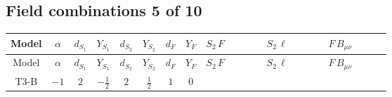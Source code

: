 \documentclass[8pt]{article}
\begin{document}
\begin{landscape}
\subsection*{Field combinations 5 of 10}
\begin{longtable}{@{}cccccccc >{\raggedright\arraybackslash}p{0.21\linewidth} >{\raggedright\arraybackslash}p{0.21\linewidth} >{\raggedright\arraybackslash}p{0.21\linewidth}@{}}
\toprule
Model & $\alpha$ & $d_{S_1}$ & $Y_{S_1}$ & $d_{S_2}$ & $Y_{S_2}$ & $d_F$ & $Y_F$ & $S_2\,F$ & $S_2\,\ell$ & $F\,B_{\mu\nu}$ \\
\midrule
\endfirsthead
\toprule
Model & $\alpha$ & $d_{S_1}$ & $Y_{S_1}$ & $d_{S_2}$ & $Y_{S_2}$ & $d_F$ & $Y_F$ & $S_2\,F$ & $S_2\,\ell$ & $F\,B_{\mu\nu}$ \\
\midrule
\endhead
T3-B & $-1$ & $2$ & $-\frac{1}{2}$ & $2$ & $\frac{1}{2}$ & $1$ & $0$ & \scriptsize\adjustbox{max width=\linewidth}{$\begin{gathered} -C_{S_2^\dagger S_2} \hbar  \log \left(\frac{\bar{\mu}^{2}}{M_F^2}\right) \overline{y_{2,i_1,r_1}} S_{2,j_1} y_{2,i_1,r_1} S_{2,j_1}{}^{\dagger } \\ -\hbar  \log \left(\frac{\bar{\mu}^{2}}{M_F^2}\right) \overline{y_{2,i_1,r_1}} \overline{y_{2,i_2,r_2}} S_{2,j_1} S_{2,j_2} y_{2,i_1,r_2} y_{2,i_2,r_1} S_{2,j_1}{}^{\dagger } S_{2,j_2}{}^{\dagger } \\ -\hbar  \log \left(\frac{\bar{\mu}^{2}}{M_F^2}\right) \overline{y_{2,i_1,r_1}} S_{2,j_3} S_{2,j_4} y_{2,i_1,r_1} S_{2,j_1}{}^{\dagger } S_{2,j_2}{}^{\dagger } \mathcal{I}_{S_2,j_1,j_3,j_2,j_4}{}^1 \lambda_{S_2}^{(1)}^{(1)}\end{gathered}$} & \scriptsize\adjustbox{max width=\linewidth}{$\begin{gathered} +\frac{3 \hbar  \overline{y_{2,i_1,r_1}} \overline{y_{2,i_2,r_1}} L_{a_2,i_2}{}^T\, C\, P_L\, L_{a_1,i_1} S_{2,j_1} S_{2,j_2} {\mathcal{I}_{y_2}}^{*}_{a_1,j_1} {\mathcal{I}_{y_2}}^{*}_{a_2,j_2} g_2^2}{8 \epsilon  M_F} \\ +\frac{\hbar  \overline{y_{2,i_1,r_1}} \overline{y_{2,i_2,r_1}} L_{a_2,i_2}{}^T\, C\, P_L\, L_{a_1,i_1} S_{2,j_1} S_{2,j_2} {\mathcal{I}_{y_2}}^{*}_{a_1,j_1} {\mathcal{I}_{y_2}}^{*}_{a_2,j_2} g_2^2}{8 M_F} \\ +\frac{3 \hbar  \overline{L_{a_1,i_1}}\, C\, P_R\, \overline{L_{a_2,i_2}}{}^T y_{2,i_1,r_1} y_{2,i_2,r_1} \mathcal{I}_{y_2,a_1,j_1} \mathcal{I}_{y_2,a_2,j_2} S_{2,j_1}{}^{\dagger } S_{2,j_2}{}^{\dagger } g_2^2}{8 \epsilon  M_F}\end{gathered}$} &  \\

\end{longtable}
\end{landscape}
\end{document}

